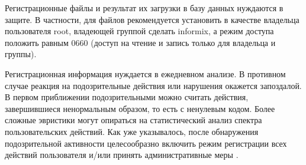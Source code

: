 Регистрационные файлы и результат их загрузки в базу данных нуждаются в защите. В частности, для
файлов рекомендуется установить в качестве владельца пользователя root, владеющей группой сделать
informix, а режим доступа положить равным 0660 (доступ на чтение и запись только для владельца и
группы).

Регистрационная информация нуждается в ежедневном анализе. В противном случае реакция на
подозрительные действия или нарушения окажется запоздалой. В первом приближении подозрительными
можно считать действия, завершившиеся ненормальным образом, то есть с ненулевым кодом. Более
сложные эвристики могут опираться на статистический анализ спектра пользовательских действий. Как
уже указывалось, после обнаружения подозрительной активности целесообразно включить режим
регистрации всех действий пользователя и/или принять административные меры \cite{dbms-security}.

